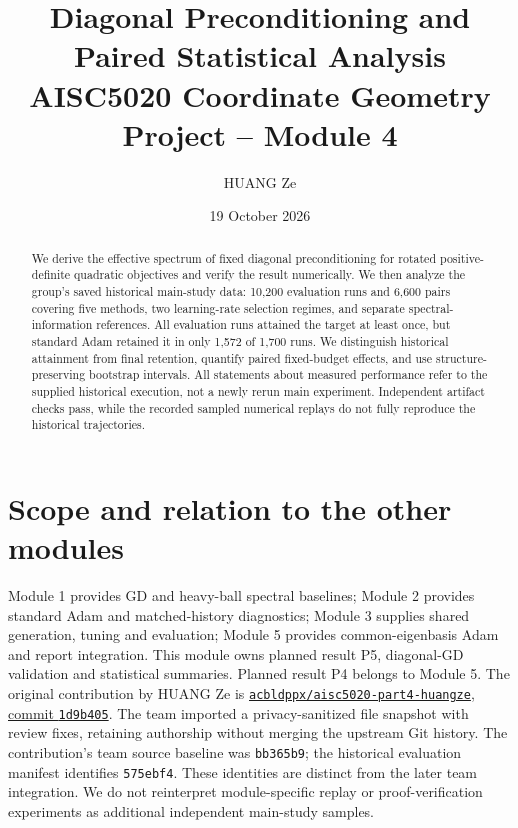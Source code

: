 \documentclass[10pt,a4paper]{article}
\title{Diagonal Preconditioning and Paired Statistical Analysis\\
\large AISC5020 Coordinate Geometry Project -- Module 4}
\author{HUANG Ze}
\date{19 October 2026}
\begin{document}
\maketitle
\begin{abstract}
We derive the effective spectrum of fixed diagonal preconditioning for rotated
positive-definite quadratic objectives and verify the result numerically.
We then analyze the group's saved historical main-study data: 10,200 evaluation
runs and 6,600 pairs covering five methods, two learning-rate selection regimes,
and separate spectral-information references. All evaluation runs attained the
target at least once, but standard Adam retained it in only 1,572 of 1,700 runs.
We distinguish historical attainment from final retention, quantify paired
fixed-budget effects, and use structure-preserving bootstrap intervals.
All statements about measured performance refer to the supplied historical
execution, not a newly rerun main experiment. Independent artifact checks pass,
while the recorded sampled numerical replays do not fully reproduce the
historical trajectories.
\end{abstract}

\section{Scope and relation to the other modules}
Module 1 provides GD and heavy-ball spectral baselines; Module 2 provides
standard Adam and matched-history diagnostics; Module 3 supplies shared
generation, tuning and evaluation; Module 5 provides common-eigenbasis Adam
and report integration. This module owns planned result P5, diagonal-GD
validation and statistical summaries. Planned result P4 belongs to Module 5.
The original contribution by HUANG Ze is
\href{https://github.com/acbldppx/aisc5020-part4-huangze/tree/1d9b405e0626e2c9b24a2fcd165025f2e68b97df}{\texttt{acbldppx/aisc5020-part4-huangze}, commit \texttt{1d9b405}}.
The team imported a privacy-sanitized file snapshot with review fixes, retaining
authorship without merging the upstream Git history. The contribution's team
source baseline was \texttt{bb365b9}; the historical evaluation manifest identifies
\texttt{575ebf4}. These identities are distinct from the later team integration.
We do not reinterpret module-specific replay or proof-verification experiments
as additional independent main-study samples.
\end{document}
